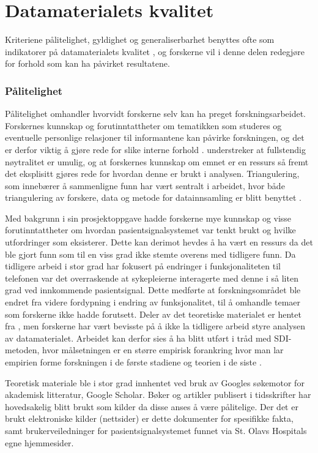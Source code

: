 \section{Datamaterialets kvalitet}
\label{kvalitativ_analyse}
Kriteriene pålitelighet, gyldighet og generaliserbarhet benyttes ofte som indikatorer på datamaterialets kvalitet \citep{Tjora}, og forskerne vil i denne delen redegjøre for forhold som kan ha påvirket resultatene. 

\subsubsection{Pålitelighet}
Pålitelighet omhandler hvorvidt forskerne selv kan ha preget forskningsarbeidet. Forskernes kunnskap og forutinntattheter om tematikken som studeres og eventuelle personlige relasjoner til informantene kan påvirke forskningen, og det er derfor viktig å gjøre rede for slike interne forhold \citep{Tjora}. \citet{Tjora} understreker at fullstendig nøytralitet er umulig, og at forskernes kunnskap om emnet er en ressurs så fremt det eksplisitt gjøres rede for hvordan denne er brukt i analysen. Triangulering, som innebærer å sammenligne funn har vært sentralt i arbeidet, hvor både triangulering av forskere, data og metode for datainnsamling er blitt benyttet \citep{Oates}. 

\noindent
Med bakgrunn i sin prosjektoppgave \citep{Sund13} hadde forskerne mye kunnskap og visse forutinntattheter om hvordan pasientsignalsystemet var tenkt brukt og hvilke utfordringer som eksisterer. Dette kan derimot hevdes å ha vært en ressurs da det ble gjort funn som til en viss grad ikke stemte overens med tidligere funn. Da tidligere arbeid i stor grad har fokusert på endringer i funksjonaliteten til telefonen var det overraskende at sykepleierne interagerte med denne i så liten grad ved innkommende pasientsignal. Dette medførte at forskningsområdet ble endret fra videre fordypning i endring av funksjonalitet, til å omhandle temaer som forskerne ikke hadde forutsett. Deler av det teoretiske materialet er hentet fra \citep{Sund13}, men forskerne har vært bevisste på å ikke la tidligere arbeid styre analysen av datamaterialet. Arbeidet kan derfor sies å ha blitt utført i tråd med SDI-metoden, hvor målsetningen er en større empirisk forankring hvor man lar empirien forme forskningen i de første stadiene og teorien i de siste \citep{Tjora}. 

\noindent
Teoretisk materiale ble i stor grad innhentet ved bruk av Googles søkemotor for akademisk litteratur, Google Scholar. Bøker og artikler publisert i tidsskrifter har hovedsakelig blitt brukt som kilder da disse anses å være pålitelige. Der det er brukt elektroniske kilder (nettsider) er dette dokumenter for spesifikke fakta, samt brukerveiledninger for pasientsignalsystemet funnet via St. Olavs Hospitals egne hjemmesider.


